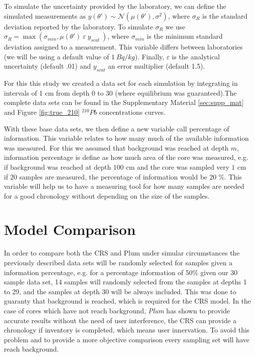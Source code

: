 \documentclass [11pt] {article}
\begin{document}
	To simulate the uncertainty provided by the laboratory, we can define the simulated measurements as  $y(\theta')\sim\mathcal{N}\left(\mu(\theta'),\sigma^2\right)$, where $\sigma_R$ is the standard deviation reported by the laboratory. To simulate $\sigma_R$ we use $\sigma_R= \max \left(\sigma_{min}, \mu(\theta')~\varepsilon~y_{scat}~\right)$, where $\sigma_{min}$ is the minimum standard deviation assigned to a measurement. This variable differs between laboratories (we will be using a default value of $1~ Bq/kg$). Finally, $\varepsilon$ is the analytical uncertainty (default .01) and $y_{scat}$ an error multiplier (default 1.5).

	For this this study we created a data set for each simulation by integrating in intervals of 1 cm from depth 0 to 30 (where equilibrium was guaranteed).The complete data sets can be found in the Supplementary Material \ref{sec:supp_mat} and Figure \ref{fig:true_210} $^{210}Pb$ concentrations curves. 

	With these base data sets, we then define a new variable call percentage of information. This variable relates to how many much of the available information was measured. For this we assumed that background was reached at depth $m$, information percentage is define as how much area of the core was measured, e.g. if background was reached at depth $100$ cm and the core was sampled very $1$ cm if 20 samples are measured, the percentage of information would be 20 \%. This variable will help us to have a measuring tool for how many samples are needed for a good chronology without depending on the size of the samples. 


\section{Model Comparison}

In order to compare both the CRS and Plum under simular circumstances the previously described data sets will be randomly selected for samples given a information percentage, e.g. for a percentage information of 50\% given our 30 sample data set, 14 samples will randomly selected from the samples at depths 1 to 29, and the samples at depth 30 will be always included. This was done to guaranty that background is reached, which is required for the CRS model. In the case of cores which have not reach background, \textit{Plum}  \citep{Aquino2018} has shown to provide accurate results without the need of user interference, the CRS can provide a chronology if inventory is completed, which means user innervation. To avoid this problem and to provide a more objective comparison every sampling set will have reach background.  
\end{document}
